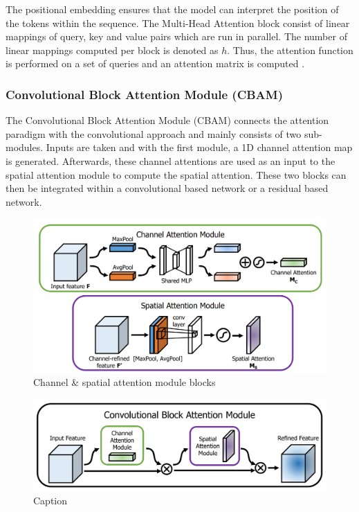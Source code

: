 The positional embedding ensures that the model can interpret the position of the tokens within the sequence. The Multi-Head Attention block consist of linear mappings of query, key and value pairs which are run in parallel. The number of linear mappings computed per block is denoted as $h$. Thus, the attention function is performed on a set of queries and an attention matrix is computed \cite{vaswani_attention_2023}.

\subsubsection{Convolutional Block Attention Module (CBAM)}
The Convolutional Block Attention Module (CBAM) connects the attention paradigm with the convolutional approach and mainly consists of two sub-modules. Inputs are taken and with the first module, a 1D channel attention map is generated. Afterwards, these channel attentions are used as an input to the spatial attention module to compute the spatial attention. These two blocks can then be integrated within a convolutional based network or a residual based network.

\begin{figure}
    \centering
    \includegraphics{Figures/cbam_modules.png}
    \caption{Channel \& spatial attention module blocks}
    \label{fig:cbam_modules}
\end{figure}

\begin{figure}
    \centering
    \includegraphics{Figures/cbam_modul.png}
    \caption{Caption}
    \label{fig:cbam}
\end{figure}


